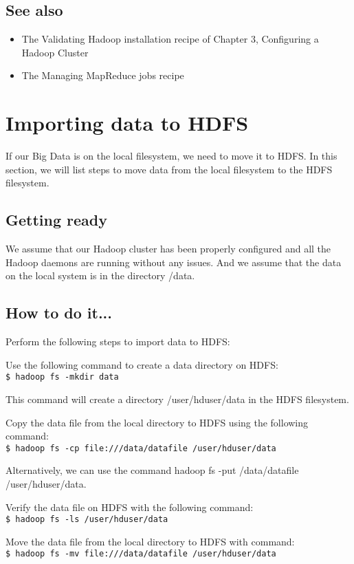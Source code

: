 \subsection*{See also}
\begin{itemize}
  \item The Validating Hadoop installation recipe of Chapter 3, Configuring a Hadoop Cluster
  \item The Managing MapReduce jobs recipe
\end{itemize}


\section{Importing data to HDFS}
If our Big Data is on the local filesystem, we need to move it to HDFS. In this section, we will list steps to move data from the local filesystem to the HDFS filesystem.

\subsection*{Getting ready}
We assume that our Hadoop cluster has been properly configured and all the Hadoop daemons are running without any issues. And we assume that the data on the local system is in the directory /data.
\subsection*{How to do it...}
Perform the following steps to import data to HDFS: 

Use the following command to create a data directory on HDFS: \\
\verb|$ hadoop fs -mkdir data|

This command will create a directory /user/hduser/data in the HDFS filesystem.

Copy the data file from the local directory to HDFS using the following command: \\
\verb|$ hadoop fs -cp file:///data/datafile /user/hduser/data|

Alternatively, we can use the command hadoop fs -put /data/datafile /user/hduser/data.

Verify the data file on HDFS with the following command: \\
\verb|$ hadoop fs -ls /user/hduser/data|

Move the data file from the local directory to HDFS with command: \\
\verb|$ hadoop fs -mv file:///data/datafile /user/hduser/data|

